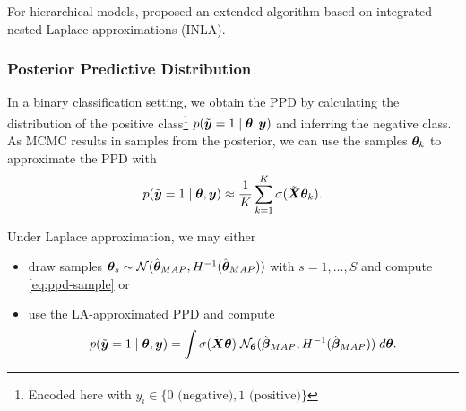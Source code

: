 For hierarchical models, \citet{rue_approximate_2009} proposed an extended algorithm based on integrated nested Laplace approximations (INLA).

\subsubsection*{Posterior Predictive Distribution}

In a binary classification setting, we obtain the PPD by calculating the distribution of the positive class\footnote{
    Encoded here with $y_i \in \{0 \text{ (negative)}, 1 \text{ (positive)}\}$
} $p(\tilde{\bm{y}} = 1 \mid \bm{\theta}, \bm{y})$ and inferring the negative class.\\

As MCMC results in samples from the posterior, we can use the samples $\bm{\theta}_k$ to approximate the PPD with
\begin{equation}\label{eq:ppd-sample}
    p(\tilde{\bm{y}} = 1 \mid \bm{\theta}, \bm{y}) \approx \frac{1}{K} \sum_{k=1}^{K} \sigma(\tilde{\bm{X}} \bm{\theta}_k).
\end{equation}

Under Laplace approximation, we may either
\begin{itemize}
    \item draw samples $\bm{\theta}_s \sim \mathcal{N}(\hat{\bm{\theta}}_{MAP}, H^{-1}(\hat{\bm{\theta}}_{MAP}))$ with $s = 1, \dots, S$ and compute \autoref{eq:ppd-sample} or
    \item use the LA-approximated PPD and compute
    \begin{equation*}
        p(\tilde{\bm{y}} = 1 \mid \bm{\theta}, \bm{y}) = \int \sigma(\tilde{\bm{X}} \bm{\theta}) \; \mathcal{N}_{\bm{\theta}}(\hat{\bm{\beta}}_{MAP}, H^{-1} (\hat{\bm{\beta}}_{MAP})) \; d \bm{\theta}.
    \end{equation*}
\end{itemize}
